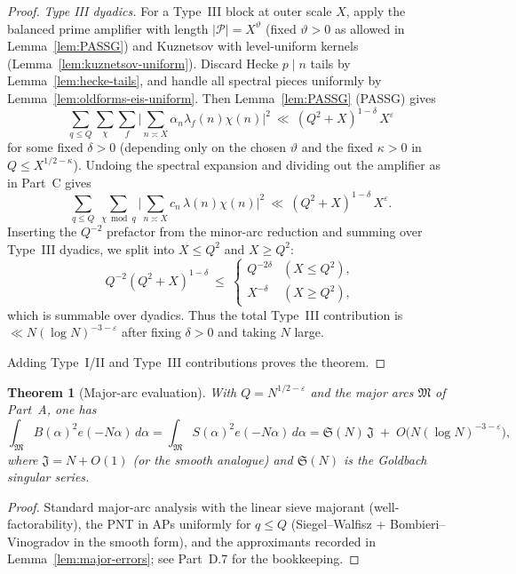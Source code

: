 \documentclass[11pt]{article}
\newtheorem{theorem}[lemma]{Theorem}
\theoremstyle{definition}
\theoremstyle{remark}
\numberwithin{equation}{part}
\begin{document}
\begin{proof}
	\emph{Type III dyadics.} For a Type~III block at outer scale $X$, apply the balanced prime amplifier with length $|\mathcal P|=X^\vartheta$ (fixed $\vartheta>0$ as allowed in Lemma~\ref{lem:PASSG}) and Kuznetsov with level-uniform kernels (Lemma~\ref{lem:kuznetsov-uniform}).
	Discard Hecke $p\mid n$ tails by Lemma~\ref{lem:hecke-tails}, and handle all spectral pieces uniformly by Lemma~\ref{lem:oldforms-eis-uniform}.
	Then Lemma~\ref{lem:PASSG} (PASSG) gives
	\[
		\sum_{q\le Q}\sum_{\chi}\sum_f
		\Big|\sum_{n\asymp X}\alpha_n\lambda_f(n)\chi(n)\Big|^2
		\ \ll\ (Q^2+X)^{1-\delta}\,X^\varepsilon
	\]
	for some fixed $\delta>0$ (depending only on the chosen $\vartheta$ and the fixed $\kappa>0$ in $Q\le X^{1/2-\kappa}$).
	Undoing the spectral expansion and dividing out the amplifier as in Part~C gives
	\[
		\sum_{q\le Q}\ \sum_{\chi\bmod q}\Big|\sum_{n\asymp X} c_n\,\lambda(n)\chi(n)\Big|^2
		\ \ll\ (Q^2+X)^{1-\delta}\,X^\varepsilon.
	\]
	Inserting the $Q^{-2}$ prefactor from the minor-arc reduction and summing over Type~III dyadics, we split into $X\le Q^2$ and $X\ge Q^2$:
	\[
		Q^{-2}(Q^2+X)^{1-\delta}\ \le\
		\begin{cases}
			Q^{-2\delta} & (X\le Q^2), \\
			X^{-\delta}  & (X\ge Q^2),
		\end{cases}
	\]
	which is summable over dyadics. Thus the total Type~III contribution is $\ll N(\log N)^{-3-\varepsilon}$ after fixing $\delta>0$ and taking $N$ large.

	Adding Type~I/II and Type~III contributions proves the theorem.
\end{proof}

\begin{theorem}[Major-arc evaluation]\label{thm:major-eval}
	With $Q=N^{1/2-\varepsilon}$ and the major arcs $\mathfrak M$ of Part~A, one has
	\[
		\int_{\mathfrak M} B(\alpha)^2 e(-N\alpha)\,d\alpha
		=\int_{\mathfrak M} S(\alpha)^2 e(-N\alpha)\,d\alpha
		=\mathfrak S(N)\,\mathfrak J\;+\;O\!\big(N(\log N)^{-3-\varepsilon}\big),
	\]
	where $\mathfrak J=N+O(1)$ (or the smooth analogue) and $\mathfrak S(N)$ is the Goldbach singular series.
\end{theorem}

\begin{proof}
	Standard major-arc analysis with the linear sieve majorant (well-factorability), the PNT in APs uniformly for $q\le Q$ (Siegel–Walfisz + Bombieri–Vinogradov in the smooth form), and the approximants recorded in Lemma~\ref{lem:major-errors}; see Part~D.7 for the bookkeeping.
\end{proof}
\end{document}
